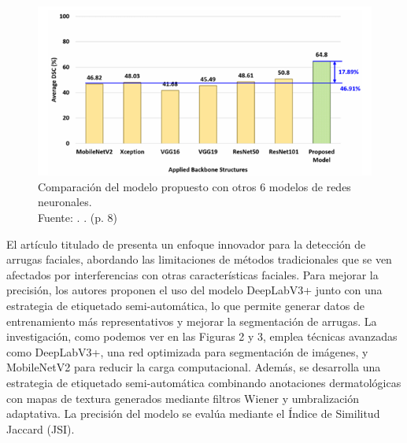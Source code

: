 \begin{figure}[!ht]
	\begin{center}
		\includegraphics[width=1\textwidth]{2/figures/resultados de cuarto anteedente.png}
		\caption[Comparación del modelo propuesto con otros 6 modelos de redes neuronales]{Comparación del modelo propuesto con otros 6 modelos de redes neuronales.\\
			Fuente: \cite{Kim2023}. . (p. 8)}
		\label{2:fig1}
	\end{center}
\end{figure}


El artículo titulado  de \cite{Zhong2024} presenta un enfoque innovador para la detección de arrugas faciales, abordando las limitaciones de métodos tradicionales que se ven afectados por interferencias con otras características faciales. Para mejorar la precisión, los autores proponen el uso del modelo DeepLabV3+ junto con una estrategia de etiquetado semi-automática, lo que permite generar datos de entrenamiento más representativos y mejorar la segmentación de arrugas.
La investigación, como podemos ver en las Figuras 2 y 3, emplea técnicas avanzadas como DeepLabV3+, una red optimizada para segmentación de imágenes, y MobileNetV2 para reducir la carga computacional. Además, se desarrolla una estrategia de etiquetado semi-automática combinando anotaciones dermatológicas con mapas de textura generados mediante filtros Wiener y umbralización adaptativa. La precisión del modelo se evalúa mediante el Índice de Similitud Jaccard (JSI).

